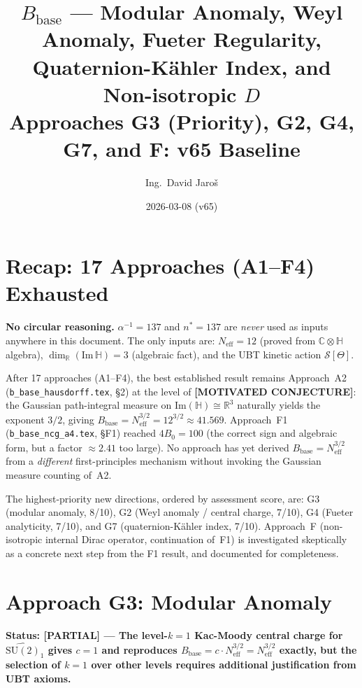 \documentclass[11pt,a4paper]{article}
\title{$B_{\mathrm{base}}$ — Modular Anomaly, Weyl Anomaly, Fueter Regularity,\\
    Quaternion-Kähler Index, and Non-isotropic $D$\\
    \large Approaches G3 (Priority), G2, G4, G7, and F: v65 Baseline}
\author{Ing.\ David Jaroš}
\date{2026-03-08 (v65)}
\theoremstyle{definition}
\theoremstyle{remark}
\begin{document}
  \maketitle
\fi

\section{Recap: 17 Approaches (A1--F4) Exhausted}
\label{sec:recap_f4}

\noindent\textbf{No circular reasoning.}
$\alpha^{-1} = 137$ and $n^* = 137$ are \emph{never} used as inputs
anywhere in this document.
The only inputs are: $N_{\mathrm{eff}} = 12$ (proved from
$\mathbb{C}\otimes\mathbb{H}$ algebra), $\dim_\mathbb{R}(\mathrm{Im}\,\mathbb{H}) = 3$
(algebraic fact), and the UBT kinetic action $\mathcal{S}[\Theta]$.

After 17 approaches (A1--F4), the best established result remains
Approach~A2 (\texttt{b\_base\_hausdorff.tex}, \S2) at the level of
\textbf{[MOTIVATED CONJECTURE]}: the Gaussian path-integral measure on
$\mathrm{Im}(\mathbb{H}) \cong \mathbb{R}^3$ naturally yields the exponent $3/2$,
giving $B_{\mathrm{base}} = N_{\mathrm{eff}}^{3/2} = 12^{3/2} \approx 41.569$.
Approach~F1 (\texttt{b\_base\_ncg\_a4.tex}, \S F1) reached $4 B_0 = 100$
(the correct sign and algebraic form, but a factor $\approx 2.41$ too large).
No approach has yet derived $B_{\mathrm{base}} = N_{\mathrm{eff}}^{3/2}$
from a \emph{different} first-principles mechanism without invoking the
Gaussian measure counting of~A2.

The highest-priority new directions, ordered by assessment score, are:
G3 (modular anomaly, 8/10), G2 (Weyl anomaly / central charge, 7/10),
G4 (Fueter analyticity, 7/10), and G7 (quaternion-Kähler index, 7/10).
Approach~F (non-isotropic internal Dirac operator, continuation of~F1) is
investigated skeptically as a concrete next step from the F1 result, and
documented for completeness.

\section{Approach G3: Modular Anomaly}
\label{sec:G3}

\textbf{Status: [PARTIAL] — The level-$k=1$ Kac-Moody central charge for
$\widehat{\mathrm{SU}(2)}_1$ gives $c = 1$ and reproduces
$B_{\mathrm{base}} = c \cdot N_{\mathrm{eff}}^{3/2} = N_{\mathrm{eff}}^{3/2}$
exactly, but the selection of $k = 1$ over other levels requires additional
justification from UBT axioms.}
\end{document}
